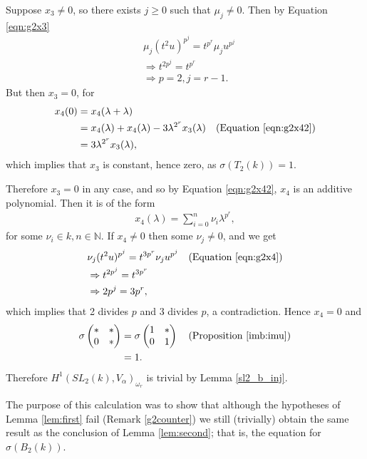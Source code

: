 	Suppose $x_3\neq 0$, so there exists $j\geq 0$ such that $\mu_j\neq 0$. Then by Equation \ref{eqn:g2x3}
	\begin{align*}
	&\mu_j (t^2u)^{p^j} = t^{p^r}\mu_j u^{p^j}\\
		&\Rightarrow t^{2p^j} = t^{p^r}\\
		&\Rightarrow p = 2, j = r-1.
		\end{align*}
		But then $x_3 = 0$, for
		\begin{align*}
		x_4(0) &= x_4(\lambda + \lambda) \\
							&= x_4(\lambda)+x_4(\lambda)-3\lambda^{2^r}x_3(\lambda)\quad(\textrm{Equation \ref{eqn:g2x42}}) \\
							&= 3\lambda^{2^r}x_3(\lambda),
		\end{align*}
		which implies that $x_3$ is constant, hence zero, as $\sigma(T_2(k)) = 1$.

		Therefore $x_3 = 0$ in any case, and so by Equation \ref{eqn:g2x42}, $x_4$ is an additive polynomial. Then it is of the form
		\begin{align*}
		x_4(\lambda) = \sum_{i=0}^n \nu_i \lambda^{p^r},
		\end{align*}
		for some $\nu_i \in k, n\in\mathbb{N}$.
		If $x_4\neq 0$ then some $\nu_j\neq 0$, and we get
		\begin{align*}
		&\nu_j(t^2u)^{p^j} = t^{3p^r}\nu_j u^{p^j}\quad(\textrm{Equation \ref{eqn:g2x4}})\\
			&\Rightarrow t^{2p^j} = t^{3p^r}\\
			&\Rightarrow 2p^j = 3p^r,
		\end{align*}
		which implies that 2 divides $p$ and 3 divides $p$, a contradiction. Hence $x_4=0$ and
		\begin{align*}
		\sigma\left(\begin{matrix}* & *\\0 & *\end{matrix}\right) &= \sigma\left(\begin{matrix}1 & *\\0 & 1\end{matrix}\right) \quad(\textrm{Proposition \ref{imb:imu}}) \\
			&= 1.
			\end{align*}
			Therefore $H^1(SL_2(k), V_\alpha)_{\omega_r}$ is trivial by Lemma \ref{sl2_b_inj}.

The purpose of this calculation was to show that although the hypotheses of Lemma \ref{lem:first} fail (Remark \ref{g2counter}) we still (trivially) obtain the same result as the conclusion of Lemma \ref{lem:second}; that is, the equation for $\sigma(B_2(k))$.

